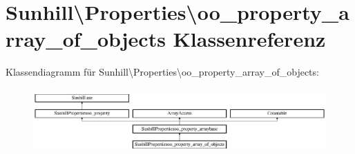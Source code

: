 \hypertarget{classSunhill_1_1Properties_1_1oo__property__array__of__objects}{}\section{Sunhill\textbackslash{}Properties\textbackslash{}oo\+\_\+property\+\_\+array\+\_\+of\+\_\+objects Klassenreferenz}
\label{classSunhill_1_1Properties_1_1oo__property__array__of__objects}
Klassendiagramm für Sunhill\textbackslash{}Properties\textbackslash{}oo\+\_\+property\+\_\+array\+\_\+of\+\_\+objects\+:\begin{figure}[H]
\begin{center}
\leavevmode
\includegraphics[height=2.522522cm]{dd/d48/classSunhill_1_1Properties_1_1oo__property__array__of__objects}
\end{center}
\end{figure}
